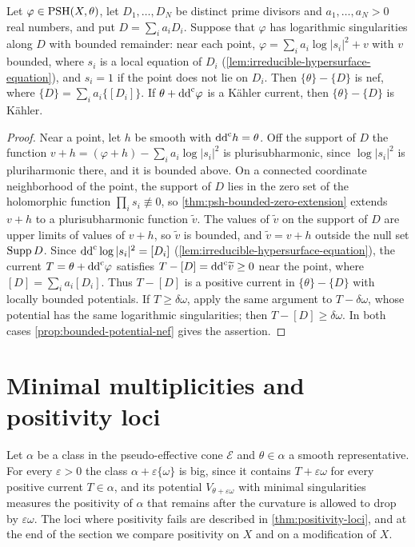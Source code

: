 \begin{corollary}\label{cor:divisorial-logarithmic-residual}
Let $\varphi\in\mathrm{PSH}(X,\theta)$, let $D_1,\ldots,D_N$ be distinct prime divisors and $a_1,\ldots,a_N>0$ real numbers, and put $D=\sum_ia_iD_i$. Suppose that $\varphi$ has logarithmic singularities along $D$ with bounded remainder: near each point, $\varphi=\sum_ia_i\log|s_i|^2+v$ with $v$ bounded, where $s_i$ is a local equation of $D_i$ (\cref{lem:irreducible-hypersurface-equation}), and $s_i=1$ if the point does not lie on $D_i$. Then $\{\theta\}-\{D\}$ is nef, where $\{D\}=\sum_ia_i\{[D_i]\}$. If $\theta+\mathrm{dd}^{\mathrm{c}}\varphi$ is a K\"ahler current, then $\{\theta\}-\{D\}$ is K\"ahler.
\end{corollary}
\begin{proof}
Near a point, let $h$ be smooth with $\mathrm{dd}^{\mathrm{c}} h=\theta$. Off the support of $D$ the function $v+h=(\varphi+h)-\sum_ia_i\log|s_i|^2$ is plurisubharmonic, since $\log|s_i|^2$ is pluriharmonic there, and it is bounded above. On a connected coordinate neighborhood of the point, the support of $D$ lies in the zero set of the holomorphic function $\prod_is_i\not\equiv0$, so \cref{thm:psh-bounded-zero-extension} extends $v+h$ to a plurisubharmonic function $\widetilde v$. The values of $\widetilde v$ on the support of $D$ are upper limits of values of $v+h$, so $\widetilde v$ is bounded, and $\widetilde v=v+h$ outside the null set $\operatorname{Supp} D$. Since $\mathrm{dd}^{\mathrm{c}}\log|s_i|^2=[D_i]$ (\cref{lem:irreducible-hypersurface-equation}), the current $T=\theta+\mathrm{dd}^{\mathrm{c}}\varphi$ satisfies $T-[D]=\mathrm{dd}^{\mathrm{c}}\widetilde v\geq0$ near the point, where $[D]=\sum_ia_i[D_i]$. Thus $T-[D]$ is a positive current in $\{\theta\}-\{D\}$ with locally bounded potentials. If $T\geq\delta\omega$, apply the same argument to $T-\delta\omega$, whose potential has the same logarithmic singularities; then $T-[D]\geq\delta\omega$. In both cases \cref{prop:bounded-potential-nef} gives the assertion.
\end{proof}

\section{Minimal multiplicities and positivity loci}
\label{sec:non-nef-non-kahler}
Let $\alpha$ be a class in the pseudo-effective cone $\mathcal E$ and $\theta\in\alpha$ a smooth representative. For every $\varepsilon>0$ the class $\alpha+\varepsilon\{\omega\}$ is big, since it contains $T+\varepsilon\omega$ for every positive current $T\in\alpha$, and its potential $V_{\theta+\varepsilon\omega}$ with minimal singularities measures the positivity of $\alpha$ that remains after the curvature is allowed to drop by $\varepsilon\omega$. The loci where positivity fails are described in \cref{thm:positivity-loci}, and at the end of the section we compare positivity on $X$ and on a modification of $X$.

